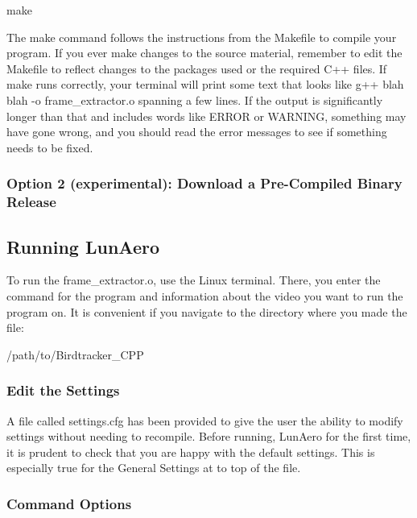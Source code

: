 \begin{DoxyCode}
make
\end{DoxyCode}


The {\ttfamily make} command follows the instructions from the {\ttfamily Makefile} to compile your program. If you ever make changes to the source material, remember to edit the {\ttfamily Makefile} to reflect changes to the packages used or the required C++ files. If {\ttfamily make} runs correctly, your terminal will print some text that looks like {\ttfamily g++ blah blah -\/o frame\+\_\+extractor.\+o} spanning a few lines. If the output is significantly longer than that and includes words like E\+R\+R\+OR or W\+A\+R\+N\+I\+NG, something may have gone wrong, and you should read the error messages to see if something needs to be fixed.

\subsubsection*{Option 2 (experimental)\+: Download a Pre-\/\+Compiled Binary Release}

\subsection*{Running Lun\+Aero}

To run the {\ttfamily frame\+\_\+extractor.\+o}, use the Linux terminal. There, you enter the command for the program and information about the video you want to run the program on. It is convenient if you navigate to the directory where you made the file\+:


\begin{DoxyCode}
/path/to/Birdtracker\_CPP
\end{DoxyCode}


\subsubsection*{Edit the Settings}

A file called {\ttfamily settings.\+cfg} has been provided to give the user the ability to modify settings without needing to recompile. Before running, Lun\+Aero for the first time, it is prudent to check that you are happy with the default settings. This is especially true for the General Settings at to top of the file.

\subsubsection*{Command Options}

